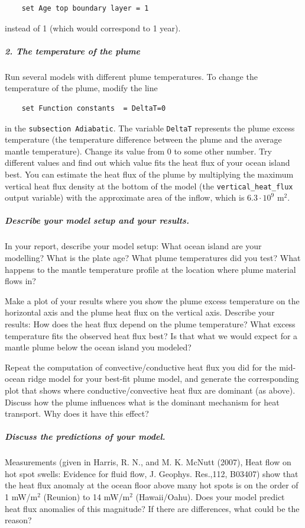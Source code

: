 \begin{verbatim}
    set Age top boundary layer = 1
\end{verbatim}

instead of 1 (which would correspond to 1 year). 

\subparagraph{2. The temperature of the plume}
Run several models with different plume temperatures. To change the temperature of the plume, modify the line

\begin{verbatim}
    set Function constants  = DeltaT=0
\end{verbatim}

in the \texttt{subsection Adiabatic}. The variable \texttt{DeltaT} represents the plume excess temperature (the temperature difference between the plume and the average mantle temperature). Change its value from 0 to some other number. Try different values and find out which value fits the heat flux of your ocean island best. You can estimate the heat flux of the plume by multiplying the maximum vertical heat flux density at the bottom of the model (the \texttt{vertical\_heat\_flux} output variable) with the approximate area of the inflow, which is $6.3 \cdot 10^9$ m$^2$. 

\subparagraph{Describe your model setup and your results.}
In your report, describe your model setup: What ocean island are your modelling? What is the plate age? What plume temperatures did you test? What happens to the mantle temperature profile at the location where plume material flows in?

Make a plot of your results where you show the plume excess temperature on the horizontal axis and the plume heat flux on the vertical axis. Describe your results: How does the heat flux depend on the plume temperature? What excess temperature fits the observed heat flux best? Is that what we would expect for a mantle plume below the ocean island you modeled? 

Repeat the computation of convective/conductive heat flux you did for the mid-ocean ridge model for your best-fit plume model, 
and generate the corresponding plot that shows where conductive/convective heat flux are dominant (as above). Discuss how the plume influences what is the dominant mechanism for heat transport. Why does it have this effect?

\subparagraph{Discuss the predictions of your model.}

Measurements (given in Harris, R. N., and M. K. McNutt (2007), Heat flow on hot spot swells: Evidence for fluid flow, J. Geophys. Res.,112, B03407) show that the heat flux anomaly at the ocean floor above many hot spots is on the order of 1 mW/m$^2$ (Reunion) to 14 mW/m$^2$ (Hawaii/Oahu). Does your model predict heat flux anomalies of this magnitude? If there are differences, what could be the reason?

